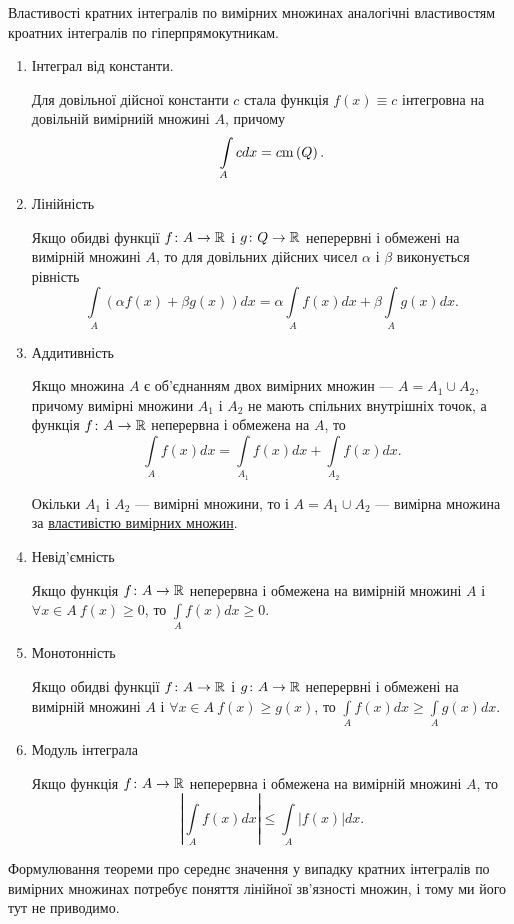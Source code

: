 Властивості кратних інтегралів по вимірних множинах аналогічні властивостям кроатних інтегралів по гіперпрямокутникам.
\begin{enumerate}
\item Інтеграл від константи.
\begin{intextProposition}
Для довільної дійсної константи $c$ стала функція ${f(x) \equiv c}$ інтегровна на довільній вимірниій множині $A$, причому
\[
\int\limits_{A} c d x = c\mathrm{m}\left(Q\right).
\]
\end{intextProposition}
\item Лінійність
\begin{intextProposition}
Якщо обидві функції ${f\colon A \to \mathbb{R}}$ і ${g\colon Q \to \mathbb{R}}$ неперервні і обмежені на вимірній множині $A$, то для довільних дійсних чисел $\alpha$ і $\beta$ виконується рівність
\[
\int\limits_{A} \left(\alpha f(x) + \beta g(x)\right)d x = \alpha\int\limits_{A} f(x) d x + \beta\int\limits_{A} g(x) d x.
\]
\end{intextProposition}
\item Аддитивність
\begin{intextProposition}
Якщо множина $A$ є об'єднанням двох вимірних множин --- ${A = A_1 \cup A_2}$, причому вимірні множини $A_1$ і $A_2$ не мають спільних внутрішніх точок, а функція ${f\colon A \to \mathbb{R}}$ неперервна і обмежена на $A$, то
\[
\int\limits_{A} f(x) d x = \int\limits_{A_1} f(x) d x + \int\limits_{A_2} f(x) d x.
\]
\end{intextProposition}
\begin{remark}
Окільки $A_1$ і $A_2$ --- вимірні множини, то і ${A = A_1 \cup A_2}$ --- вимірна множина за \hyperref[prop:measrable_sets:1]{властивістю вимірних множин}.
\end{remark}
\item Невід'ємність
\begin{intextProposition}
Якщо функція ${f\colon A \to \mathbb{R}}$ неперервна і обмежена на вимірній множині $A$ і ${\forall x\in A\ f(x)\geq 0}$, то ${\int\limits_{A} f(x) d x \geq 0.}$
\end{intextProposition}
\item Монотонність
\begin{intextProposition}
Якщо обидві функції ${f\colon A \to \mathbb{R}}$ і ${g\colon A \to \mathbb{R}}$ неперервні і обмежені на вимірній множині $A$ і ${\forall x\in A\ f(x)\geq g(x)}$, то ${\int\limits_{A} f(x) d x \geq \int\limits_{A} g(x) d x.}$
\end{intextProposition}
\item Модуль інтеграла
\begin{intextProposition}
Якщо функція ${f\colon A \to \mathbb{R}}$ неперервна і обмежена на вимірній множині $A$, то
\[
\left|\int\limits_{A} f(x) d x\right| \leq \int\limits_{A} \left|f(x)\right| d x.
\]
\end{intextProposition}
\end{enumerate}
\begin{remark}
Формулювання теореми про середнє значення у випадку кратних інтегралів по вимірних множинах потребує поняття лінійної зв'язності множин, і тому ми його тут не приводимо.
\end{remark}

